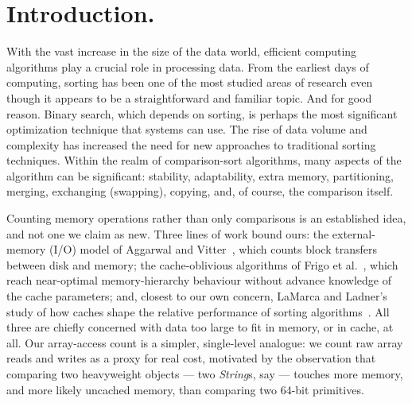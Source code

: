\documentclass[twoside,leqno,twocolumn]{article}
\begin{document}
\section{Introduction.}
With the vast increase in the size of the data world, efficient computing algorithms play a crucial role in processing data.
From the earliest days of computing,
sorting has been one of the most studied areas of research even though it appears to be a straightforward and familiar topic.
And for good reason.
Binary search, which depends on sorting, is perhaps the most significant optimization technique that systems can use.
The rise of data volume and complexity has increased the need for new approaches to traditional sorting techniques.
Within the realm of comparison-sort algorithms, many aspects of the algorithm can be significant:
stability, adaptability, extra memory, partitioning, merging, exchanging (swapping), copying, and, of course, the comparison itself.

Counting memory operations rather than only comparisons is an established idea, and not one we claim
as new.
Three lines of work bound ours: the external-memory (I/O) model of Aggarwal and
Vitter~\cite{10.1145/48529.48535}, which counts block transfers between disk and memory;
the cache-oblivious algorithms of Frigo et al.~\cite{814600}, which reach near-optimal
memory-hierarchy behaviour without advance knowledge of the cache parameters;
and, closest to our own concern, LaMarca and Ladner's study of how caches shape the relative
performance of sorting algorithms~\cite{LAMARCA199966}.
All three are chiefly concerned with data too large to fit in memory, or in cache, at all.
Our array-access count is a simpler, single-level analogue: we count raw array reads and writes as a
proxy for real cost, motivated by the observation that comparing two heavyweight objects --- two
\textit{String}s, say --- touches more memory, and more likely uncached memory, than comparing two
64-bit primitives.
\end{document}
